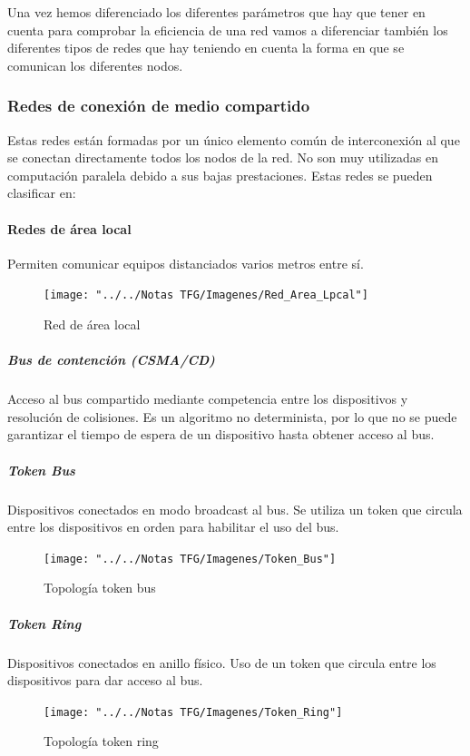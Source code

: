 Una vez hemos diferenciado los diferentes parámetros que hay que tener en cuenta para comprobar la eficiencia de una red vamos a diferenciar también los diferentes tipos de redes que hay teniendo en cuenta la forma en que se comunican los diferentes nodos.

\subsubsection{Redes de conexión de medio compartido}
Estas redes están formadas por un único elemento común de interconexión al que se conectan directamente todos los nodos de la red. No son muy utilizadas en computación paralela debido a sus bajas prestaciones. Estas redes se pueden clasificar en:\cite{shareNetworks} 

\paragraph{Redes de área local}
Permiten comunicar equipos distanciados varios metros entre sí.

\begin{figure}[H]
	\centering
	\texttt{[image: "../../Notas TFG/Imagenes/Red\_Area\_Lpcal"]}
	\caption{Red de área local}
	\label{fig:redarealocal}
\end{figure}

\subparagraph{Bus de contención (CSMA/CD)}
Acceso al bus compartido mediante competencia entre los dispositivos y resolución de colisiones. Es un algoritmo no determinista, por lo que no se puede garantizar el tiempo de espera de un dispositivo hasta obtener acceso al bus.

\subparagraph{Token Bus}
Dispositivos conectados en modo broadcast al bus. Se utiliza un token que circula entre los dispositivos en orden para habilitar el uso del bus.

\begin{figure}[H]
	\centering
	\texttt{[image: "../../Notas TFG/Imagenes/Token\_Bus"]}
	\caption{Topología token bus}
	\label{fig:tokenbus}
\end{figure}

\subparagraph{Token Ring}
Dispositivos conectados en anillo físico. Uso de un token que circula entre los dispositivos para dar acceso al bus.

\begin{figure}[H]
	\centering
	\texttt{[image: "../../Notas TFG/Imagenes/Token\_Ring"]}
	\caption{Topología token ring}
	\label{fig:tokenring}
\end{figure}

